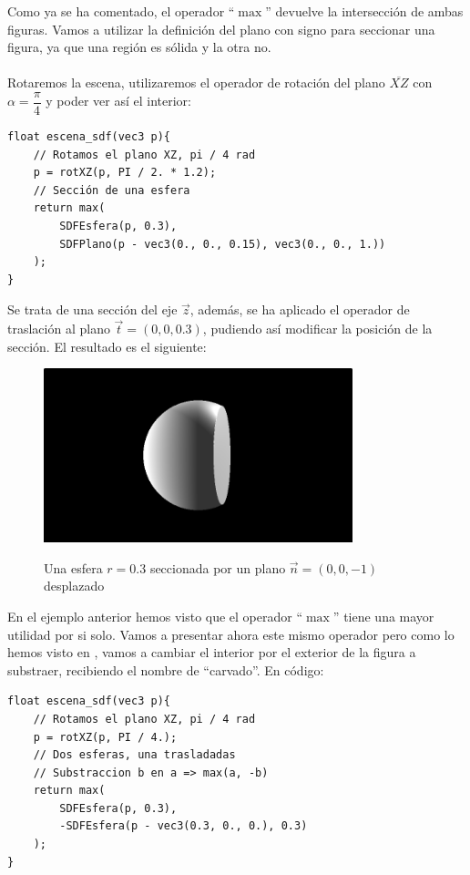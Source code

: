 Como ya se ha comentado, el operador \enquote{\(\max\)} devuelve la intersección de ambas figuras. Vamos a utilizar la definición del plano con signo para seccionar una figura, ya que una región es sólida y la otra no. \\\\
Rotaremos la escena, utilizaremos el operador de rotación del plano \(\overline{XZ}\) con \(\alpha=\dfrac{\pi}{4}\) y poder ver así el interior:

\begin{lstlisting}
float escena_sdf(vec3 p){
    // Rotamos el plano XZ, pi / 4 rad
    p = rotXZ(p, PI / 2. * 1.2);
	// Sección de una esfera
    return max(
        SDFEsfera(p, 0.3),
        SDFPlano(p - vec3(0., 0., 0.15), vec3(0., 0., 1.))
    );
}
\end{lstlisting}

Se trata de una sección del eje \(\Vec{z}\), además, se ha aplicado el operador de traslación al plano \(\Vec{t}=(0,0,0.3)\), pudiendo así modificar la posición de la sección. El resultado es el siguiente:

\begin{figure}[H]
  \centering
  \captionsetup{justification=centering}%
  \includegraphics[width=0.8\textwidth]{secciones/imagenes/sdf/3d/sdf_seccion_3d.png}\label{fig:seccion}
  \caption{Una esfera \(r=0.3\) seccionada por un plano \(\Vec{n}=(0,0,-1)\) desplazado}
\end{figure}

En el ejemplo anterior hemos visto que el operador \enquote{\(\max\)} tiene una mayor utilidad por si solo. Vamos a presentar ahora este mismo operador pero como lo hemos visto en , vamos a cambiar el interior por el exterior de la figura a substraer, recibiendo el nombre de \enquote{carvado}. En código:

\begin{lstlisting}
float escena_sdf(vec3 p){
    // Rotamos el plano XZ, pi / 4 rad
    p = rotXZ(p, PI / 4.);
    // Dos esferas, una trasladadas
    // Substraccion b en a => max(a, -b)
    return max(
        SDFEsfera(p, 0.3),
        -SDFEsfera(p - vec3(0.3, 0., 0.), 0.3)
    );
}
\end{lstlisting}

